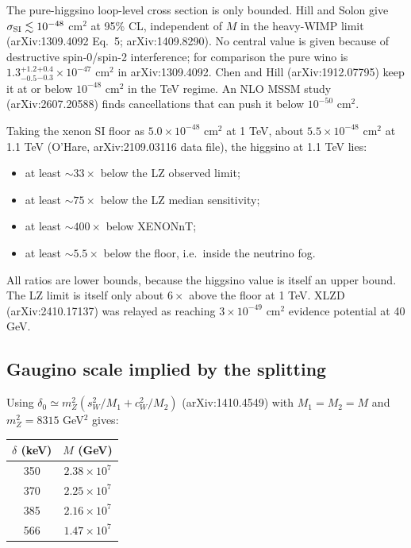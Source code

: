 \documentclass[11pt,a4paper]{article}
\begin{document}
The pure-higgsino loop-level cross section is only bounded. Hill and Solon give $\sigma_{\rm SI}\lesssim10^{-48}$ cm$^2$ at 95\% CL, independent of $M$ in the heavy-WIMP limit (arXiv:1309.4092 Eq.~5; arXiv:1409.8290). No central value is given because of destructive spin-0/spin-2 interference; for comparison the pure wino is $1.3^{+1.2}_{-0.5}{}^{+0.4}_{-0.3}\times10^{-47}$ cm$^2$ in arXiv:1309.4092. Chen and Hill (arXiv:1912.07795) keep it at or below $10^{-48}$ cm$^2$ in the TeV regime. An NLO MSSM study (arXiv:2607.20588) finds cancellations that can push it below $10^{-50}$ cm$^2$.

Taking the xenon SI floor as $5.0\times10^{-48}$ cm$^2$ at 1 TeV, about $5.5\times10^{-48}$ cm$^2$ at 1.1 TeV (O'Hare, arXiv:2109.03116 data file), the higgsino at 1.1 TeV lies:
\begin{itemize}
\item at least $\sim33\times$ below the LZ observed limit;
\item at least $\sim75\times$ below the LZ median sensitivity;
\item at least $\sim400\times$ below XENONnT;
\item at least $\sim5.5\times$ below the floor, i.e.\ inside the neutrino fog.
\end{itemize}
All ratios are lower bounds, because the higgsino value is itself an upper bound. The LZ limit is itself only about $6\times$ above the floor at 1 TeV. XLZD (arXiv:2410.17137) was relayed as reaching $3\times10^{-49}$ cm$^2$ evidence potential at 40 GeV.

\subsection{Gaugino scale implied by the splitting}
Using $\delta_0\simeq m_Z^2(s_W^2/M_1+c_W^2/M_2)$ (arXiv:1410.4549) with $M_1=M_2=M$ and $m_Z^2=8315$ GeV$^2$ gives:

\begin{center}
\begin{tabular}{cc}
\toprule
$\delta$ (keV) & $M$ (GeV) \\
\midrule
350 & $2.38\times10^{7}$ \\
370 & $2.25\times10^{7}$ \\
385 & $2.16\times10^{7}$ \\
566 & $1.47\times10^{7}$ \\
\bottomrule
\end{tabular}
\end{center}
\end{document}
